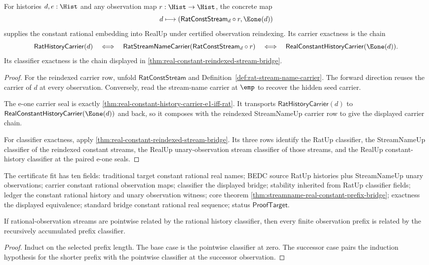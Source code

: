 \begin{theorem}
\label{thm:real-reindexed-constant-rational-embedding-certificate}
For histories $d,e:\Hist$ and any observation map $r:\Hist\to\Hist$, the
concrete map
$$
d\longmapsto (\mathsf{RatConstStream}_d\circ r,\Eone(d))
$$
supplies the constant rational embedding into RealUp under certified
observation reindexing. Its carrier exactness is the chain
$$
\mathsf{RatHistoryCarrier}(d)
\quad\Longleftrightarrow\quad
\mathsf{RatStreamNameCarrier}(\mathsf{RatConstStream}_d\circ r)
\quad\Longleftrightarrow\quad
\mathsf{RealConstantHistoryCarrier}(\Eone(d)).
$$
Its classifier exactness is the chain displayed in
\autoref{thm:real-constant-reindexed-stream-bridge}.
\end{theorem}
\begin{proof}
For the reindexed carrier row, unfold $\mathsf{RatConstStream}$ and
Definition~\ref{def:rat-stream-name-carrier}. The forward direction reuses the
carrier of $d$ at every observation. Conversely, read the stream-name carrier at
$\emp$ to recover the hidden seed carrier.

The e-one carrier seal is exactly
\autoref{thm:real-constant-history-carrier-e1-iff-rat}. It transports
$\mathsf{RatHistoryCarrier}(d)$ to
$\mathsf{RealConstantHistoryCarrier}(\Eone(d))$ and back, so it composes with
the reindexed StreamNameUp carrier row to give the displayed carrier chain.

For classifier exactness, apply
\autoref{thm:real-constant-reindexed-stream-bridge}. Its three rows identify the
RatUp classifier, the StreamNameUp classifier of the reindexed constant streams,
the RealUp unary-observation stream classifier of those streams, and the RealUp
constant-history classifier at the paired e-one seals.
\end{proof}

The certificate fit has ten fields: traditional target constant rational real
names; BEDC source RatUp histories plus StreamNameUp unary observations; carrier
constant rational observation maps; classifier the displayed bridge; stability
inherited from RatUp classifier fields; ledger the constant rational history and
unary observation witness; core theorem
\autoref{thm:streamname-real-constant-prefix-bridge}; exactness the displayed
equivalence; standard bridge constant rational real sequence; status
$\mathsf{ProofTarget}$.

\begin{theorem}
\label{thm:real-stream-classifier-prefix}
If rational-observation streams are pointwise related by the rational history classifier, then every finite observation prefix is related by the recursively accumulated prefix classifier.
\end{theorem}
\begin{proof}
Induct on the selected prefix length. The base case is the pointwise classifier at zero. The successor case pairs the induction hypothesis for the shorter prefix with the pointwise classifier at the successor observation.
\end{proof}

